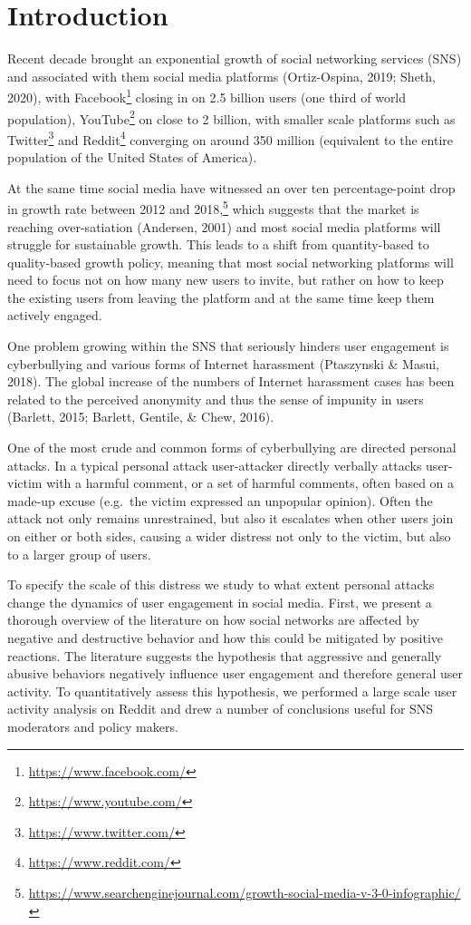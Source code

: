 \documentclass[10pt,dvipsnames]{scrartcl}
\begin{document}
\section{Introduction}
\label{intro}

Recent decade brought an exponential growth of social networking
services (SNS) and associated with them social media platforms
(Ortiz-Ospina, 2019; Sheth, 2020), with
Facebook\footnote{\url{https://www.facebook.com/}} closing in on 2.5
billion users (one third of world population),
YouTube\footnote{\url{https://www.youtube.com/}} on close to 2 billion,
with smaller scale platforms such as
Twitter\footnote{\url{https://www.twitter.com/}} and
Reddit\footnote{\url{https://www.reddit.com/}} converging on around 350
million (equivalent to the entire population of the United States of
America).

At the same time social media have witnessed an over ten
percentage-point drop in growth rate between 2012 and
2018,\footnote{\url{https://www.searchenginejournal.com/growth-social-media-v-3-0-infographic/}}
which suggests that the market is reaching over-satiation (Andersen,
2001) and most social media platforms will struggle for sustainable
growth. This leads to a shift from quantity-based to quality-based
growth policy, meaning that most social networking platforms will need
to focus not on how many new users to invite, but rather on how to keep
the existing users from leaving the platform and at the same time keep
them actively engaged.

One problem growing within the SNS that seriously hinders user
engagement is cyberbullying and various forms of Internet harassment
(Ptaszynski \& Masui, 2018). The global increase of the numbers of
Internet harassment cases has been related to the perceived anonymity
and thus the sense of impunity in users (Barlett, 2015; Barlett,
Gentile, \& Chew, 2016).

One of the most crude and common forms of cyberbullying are directed
personal attacks. In a typical personal attack user-attacker directly
verbally attacks user-victim with a harmful comment, or a set of harmful
comments, often based on a made-up excuse (e.g.~the victim expressed an
unpopular opinion). Often the attack not only remains unrestrained, but
also it escalates when other users join on either or both sides, causing
a wider distress not only to the victim, but also to a larger group of
users.

To specify the scale of this distress we study to what extent personal
attacks change the dynamics of user engagement in social media. First,
we present a thorough overview of the literature on how social networks
are affected by negative and destructive behavior and how this could be
mitigated by positive reactions. The literature suggests the hypothesis
that aggressive and generally abusive behaviors negatively influence
user engagement and therefore general user activity. To quantitatively
assess this hypothesis, we performed a large scale user activity
analysis on Reddit and drew a number of conclusions useful for SNS
moderators and policy makers.
\end{document}
